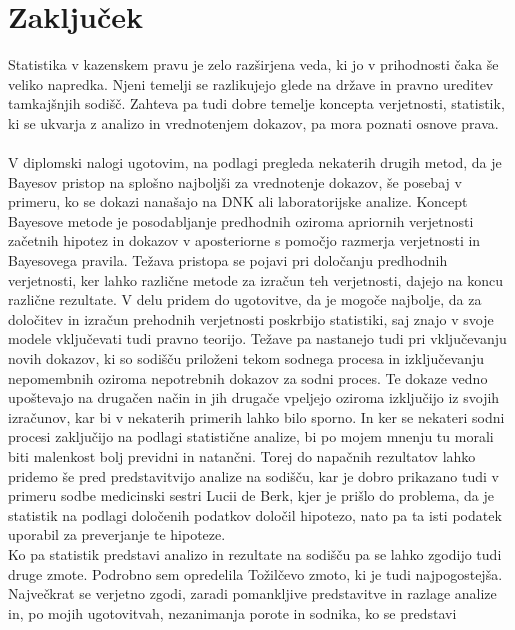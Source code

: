\documentclass[fin1, tisk]{fmfdelo}
\theoremstyle{definition}
\theoremstyle{trditev}
\theoremstyle{izrek}
\begin{document}
\section{Zaključek}
Statistika v kazenskem pravu je zelo razširjena veda, ki jo v prihodnosti čaka še veliko napredka. Njeni temelji se razlikujejo glede na države in pravno ureditev
tamkajšnjih sodišč. Zahteva pa tudi dobre temelje koncepta verjetnosti, statistik, ki se ukvarja z analizo in vrednotenjem dokazov, pa mora poznati
osnove prava.\\\\
V diplomski nalogi ugotovim, na podlagi pregleda nekaterih drugih metod, da je Bayesov pristop na splošno najboljši za vrednotenje dokazov, še posebaj v primeru,
ko se dokazi nanašajo na DNK ali laboratorijske analize. Koncept Bayesove metode je posodabljanje predhodnih oziroma apriornih verjetnosti začetnih hipotez in dokazov v
aposteriorne s pomočjo razmerja  verjetnosti in Bayesovega pravila. Težava pristopa se pojavi pri določanju predhodnih verjetnosti, ker lahko različne metode za izračun
teh verjetnosti, dajejo na koncu različne rezultate. V delu pridem do ugotovitve, da je mogoče najbolje, da za določitev in izračun prehodnih verjetnosti poskrbijo
statistiki, saj znajo v svoje modele vključevati tudi pravno teorijo. Težave pa nastanejo tudi pri vključevanju novih dokazov, ki so sodišču priloženi
tekom sodnega procesa in izključevanju nepomembnih oziroma nepotrebnih dokazov za sodni proces. Te dokaze vedno upoštevajo na drugačen način in jih drugače
vpeljejo oziroma izključijo iz svojih izračunov, kar bi v nekaterih primerih lahko bilo sporno. In ker se nekateri sodni procesi zaključijo na podlagi statistične
analize, bi po mojem mnenju tu morali biti malenkost bolj previdni in natančni. Torej do napačnih rezultatov lahko pridemo še pred predstavitvijo analize na sodišču, kar
je dobro prikazano tudi v primeru sodbe medicinski sestri Lucii de Berk, kjer je prišlo do problema, da je statistik na podlagi določenih podatkov
določil hipotezo, nato pa ta isti podatek uporabil za preverjanje te hipoteze. \\
Ko pa statistik predstavi analizo in rezultate na sodišču pa se lahko zgodijo tudi druge zmote. Podrobno sem opredelila Tožilčevo zmoto, ki je tudi
najpogostejša. Največkrat se verjetno zgodi, zaradi pomankljive predstavitve in razlage analize in, po mojih ugotovitvah, nezanimanja porote in sodnika, ko se predstavi
\end{document}
